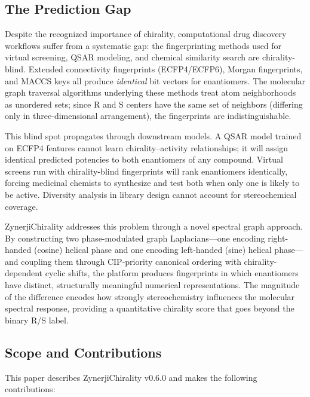 \documentclass[11pt,a4paper]{article}
\begin{document}
\subsection{The Prediction Gap}

Despite the recognized importance of chirality, computational drug discovery
workflows suffer from a systematic gap: the fingerprinting methods used for
virtual screening, QSAR modeling, and chemical similarity search are
chirality-blind. Extended connectivity fingerprints (ECFP4/ECFP6), Morgan
fingerprints, and MACCS keys all produce \textit{identical} bit vectors for
enantiomers. The molecular graph traversal algorithms underlying these methods
treat atom neighborhoods as unordered sets; since R and S centers have the same
set of neighbors (differing only in three-dimensional arrangement), the
fingerprints are indistinguishable.

This blind spot propagates through downstream models. A QSAR model trained on
ECFP4 features cannot learn chirality--activity relationships; it will assign
identical predicted potencies to both enantiomers of any compound. Virtual
screens run with chirality-blind fingerprints will rank enantiomers identically,
forcing medicinal chemists to synthesize and test both when only one is likely
to be active. Diversity analysis in library design cannot account for
stereochemical coverage.

ZynerjiChirality addresses this problem through a novel spectral graph approach.
By constructing two phase-modulated graph Laplacians---one encoding right-handed
(cosine) helical phase and one encoding left-handed (sine) helical phase---and
coupling them through CIP-priority canonical ordering with chirality-dependent
cyclic shifts, the platform produces fingerprints in which enantiomers have
distinct, structurally meaningful numerical representations. The magnitude of
the difference encodes how strongly stereochemistry influences the molecular
spectral response, providing a quantitative chirality score that goes beyond the
binary R/S label.

\subsection{Scope and Contributions}

This paper describes ZynerjiChirality v0.6.0 and makes the following contributions:
\end{document}
